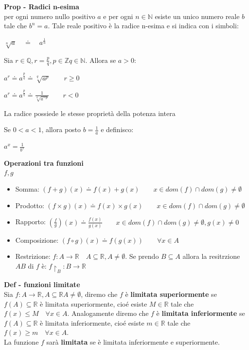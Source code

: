 \documentclass[12pt, a4paper]{article}
\begin{document}
\textbf{Prop - Radici n-esima}\\
per ogni numero nullo positivo $a$ e per ogni $n\in\mathbb{N}$ esiste un unico numero reale $b$ tale
che $b^{n}=a$. Tale reale positivo è la radice n-esima e si indica con i simboli:
\begin{center}
    $\sqrt[n]{a}\quad\doteq\quad a^{\frac{1}{n}} $
\end{center}

Sia $r\in\mathbb{Q},  r=\frac{p}{q},  p\in\mathbb{Z}  q\in\mathbb{N}$. Allora se $a>0$:
\begin{center}
    $a^{r}\doteq a^{\frac{p}{q}}\doteq \sqrt[q]{a^{p}} \qquad r\geq 0$

    $a^{r}\doteq a^{\frac{p}{q}}\doteq \frac{1}{\sqrt[q]{a^{-p}}} \qquad r<0$
\end{center}

La radice possiede le stesse proprietà della potenza intera

Se $0<a<1$, allora posto $b=\frac{1}{a}$ e definisco:
\begin{center}
    $a^{x}=\frac{1}{b^{x}}$
\end{center}

\textbf{Operazioni tra funzioni}\\$f,g$
    \begin{itemize}
        \item Somma: $(f+g)(x)\doteq f(x)+g(x)\qquad x\in dom(f)\cap dom(g)\neq \emptyset$
        \item Prodotto: $(f\times g)(x)\doteq f(x)\times g(x)\qquad x\in dom(f)\cap dom(g)\neq \emptyset$
        \item Rapporto: $(\frac{f}{g})(x)\doteq \frac{f(x)}{g(x)}\qquad x\in dom(f)\cap dom(g)\neq \emptyset
                  , g(x)\neq 0$
        \item Composizione: $(f\circ g)(x)\doteq f(g(x))\qquad \forall x\in A$
        \item Restrizione: $f:A\rightarrow\mathbb{R}\quad A\subseteq\mathbb{R},  A\neq\emptyset$. Se prendo
              $B\subseteq A$ allora la resitrzione $AB$ di $f$ è: $f\upharpoonright_{B}:  B\rightarrow\mathbb{R}$
    \end{itemize}

    \textbf{Def - funzioni limitate}\\ Sia $f:A\rightarrow\mathbb{R},  A\subseteq\mathbb{R}  A\neq\emptyset$,
    diremo che $f$ è \textbf{limitata superiormente} se $f(A)\subseteq\mathbb{R}$ è limitata superiormente,
    cioé esiste $M\in\mathbb{R}$ tale che $f(x)\leq M\quad \forall x\in A$. Analogamente diremo che $f$ è
    \textbf{limitata inferiormente} se $f(A)\subseteq\mathbb{R}$ è limitata inferiormente, cioé esiste
$m\in\mathbb{R}$ tale che $f(x)\geq m\quad \forall x\in A$.\\La funzione $f$ sarà \textbf{limitata} se
    è limitata inferiormente e superiormente.
\end{document}
